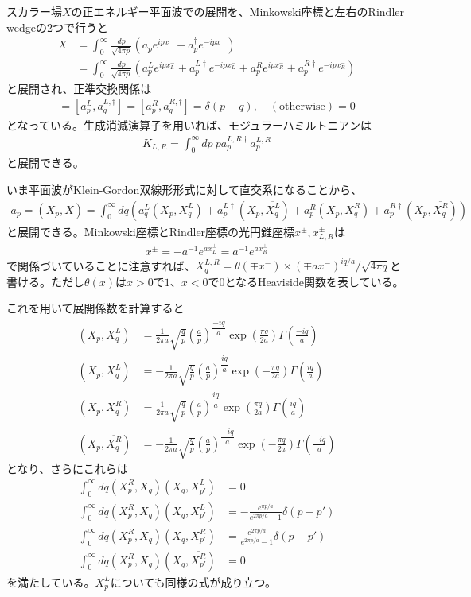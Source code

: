 スカラー場$X$の正エネルギー平面波での展開を、Minkowski座標と左右のRindler wedgeの2つで行うと
\begin{align}
X&=\int_{0}^{\infty}\frac{dp}{\sqrt{4\pi p}}(a_p e^{ip x^-}+a_p^{\dagger}e^{-ip x^-})\\
&=\int_{0}^{\infty} \frac{dp}{\sqrt{4\pi p}}(a_p^{L}e^{ip x_L^-}+a_p^{L\dagger}e^{-ip x_L^-}+a_p^{R}e^{ip x_R^-}+a_p^{R\dagger}e^{-ip x_R^-})
\end{align}
と展開され、正準交換関係は
\begin{align}
[a_p,a_q^\dagger]=[a_p^{L},a_q^{L,\dagger}]=[a_p^{R},a_q^{R,\dagger}]=\delta(p-q),\quad  (\text{otherwise})=0
\end{align}
となっている。生成消滅演算子を用いれば、モジュラーハミルトニアンは
\begin{align}
K_{L,R}=\int_{0}^{\infty} dp\  p a_p^{L,R\dagger}a_p^{L,R}
\end{align}
と展開できる。

いま平面波がKlein-Gordon双線形形式に対して直交系になることから、
\begin{align}
a_p=(X_p,X)=\int_{0}^{\infty}dq(a_q^{L}(X_p,X_q^L)+a_p^{L\dagger}(X_p,\overline{X_q^L})+a_p^{R}(X_p,X_q^R)+a_p^{R\dagger}(X_p,\overline{X_q^R}))
\end{align}
と展開できる。Minkowski座標とRindler座標の光円錐座標$x^\pm, x_{L,R}^\pm$は
\begin{align}
x^\pm=-a^{-1}e^{ax_L^\pm}=a^{-1}e^{ax_R^\pm}
\end{align}
で関係づいていることに注意すれば、$X_q^{L,R}=\theta(\mp x^-)\times (\mp ax^-)^{iq/a} /\sqrt{4\pi q}$と書ける。ただし$\theta(x)$は$x>0$で$1$、$x<0$で$0$となるHeaviside関数を表している。

これを用いて展開係数を計算すると
\begin{align}
(X_p,X_q^L)&=\frac{1}{2\pi a}\sqrt{\frac{q}{p}}\left(\frac{a}{p}\right)^{\dfrac{-iq}{a}}\exp\left(\frac{\pi q}{2a}\right)\Gamma\left(\frac{-iq}{a}\right)\\
(X_p,\overline{X_q^L})&=-\frac{1}{2\pi a}\sqrt{\frac{q}{p}}\left(\frac{a}{p}\right)^{\dfrac{iq}{a}}\exp\left(-\frac{\pi q}{2a}\right)\Gamma\left(\frac{iq}{a}\right)\\
(X_p,X_q^R)&=\frac{1}{2\pi a}\sqrt{\frac{q}{p}}\left(\frac{a}{p}\right)^{\dfrac{iq}{a}}\exp\left(\frac{\pi q}{2a}\right)\Gamma\left(\frac{iq}{a}\right)\\
(X_p,\overline{X_q^R})&=-\frac{1}{2\pi a}\sqrt{\frac{q}{p}}\left(\frac{a}{p}\right)^{\dfrac{-iq}{a}}\exp\left(-\frac{\pi q}{2a}\right)\Gamma\left(\frac{-iq}{a}\right)
\end{align}
となり、さらにこれらは
\begin{align}
\int_{0}^{\infty}dq (X_p^R,X_q)(X_q,X_{p'}^L)&=0\\
\int_{0}^{\infty}dq (X_p^R,X_q)(X_q,\overline{X_{p'}^L})&=-\frac{e^{\pi p/a}}{e^{2\pi p/a}-1}\delta(p-p')\\
\int_{0}^{\infty}dq (X_p^R,X_q)(X_q,X_{p'}^R)&=\frac{e^{2\pi p/a}}{e^{2\pi p/a}-1}\delta(p-p')\\
\int_{0}^{\infty}dq (X_p^R,X_q)(X_q,\overline{X_{p'}^R})&=0
\end{align}
を満たしている。$X_p^L$についても同様の式が成り立つ。

